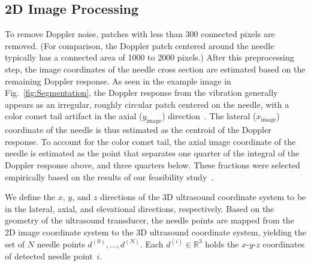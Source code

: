\subsection{2D Image Processing}
To remove Doppler noise, patches with less than 300 connected pixels are removed. (For comparison, the Doppler patch centered around the needle typically has a connected area of 1000 to 2000 pixels.) After this preprocessing step, the image coordinates of the needle cross section are estimated based on the remaining Doppler response. As seen in the example image in Fig.~\ref{fig:Segmentation}, the Doppler response from the vibration generally appears as an irregular, roughly circular patch centered on the needle, with a color comet tail artifact in the axial ($y_\text{image}$) direction~\cite{Tchelepi2009}. The lateral ($x_\text{image}$) coordinate of the needle is thus estimated as the centroid of the Doppler response. To account for the color comet tail, the axial image coordinate of the needle is estimated as the point that separates one quarter of the integral of the Doppler response above, and three quarters below. These fractions were selected empirically based on the results of our feasibility study~\cite{Adebar2013}. 

We define the $x$, $y$, and $z$ directions of the 3D ultrasound coordinate system to be in the lateral, axial, and elevational directions, respectively. Based on the geometry of the ultrasound transducer, the needle points are mapped from the 2D image coordinate system to the 3D ultrasound coordinate system, yielding the set of $N$ needle points $d^{(0)}, \dotsc, d^{(N)}$. Each $d^{(i)} \in \mathbb{R}^{3}$ holds the $x$-$y$-$z$ coordinates of detected needle point~$i$.

